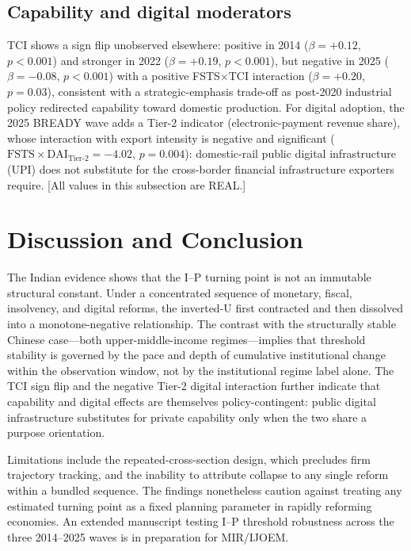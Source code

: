 \documentclass[12pt,a4paper]{article}
\begin{document}
\subsection{Capability and digital moderators}
TCI shows a sign flip unobserved elsewhere: positive in 2014
($\beta=+0.12$, $p<0.001$) and stronger in 2022 ($\beta=+0.19$, $p<0.001$),
but negative in 2025 ($\beta=-0.08$, $p<0.001$) with a positive
FSTS$\times$TCI interaction ($\beta=+0.20$, $p=0.03$), consistent with a
strategic-emphasis trade-off \citep{mizik2003} as post-2020 industrial policy
redirected capability toward domestic production. For digital adoption, the
2025 BREADY wave adds a Tier-2 indicator (electronic-payment revenue share),
whose interaction with export intensity is negative and significant
($\mathrm{FSTS}\times\mathrm{DAI}_{\text{Tier-2}}=-4.02$, $p=0.004$):
domestic-rail public digital infrastructure (UPI) does not substitute for the
cross-border financial infrastructure exporters require. [All values in this
subsection are REAL.]

\section{Discussion and Conclusion}
The Indian evidence shows that the I--P turning point is not an immutable
structural constant. Under a concentrated sequence of monetary, fiscal,
insolvency, and digital reforms, the inverted-U first contracted and then
dissolved into a monotone-negative relationship. The contrast with the
structurally stable Chinese case---both upper-middle-income regimes---implies
that threshold stability is governed by the pace and depth of cumulative
institutional change within the observation window, not by the institutional
regime label alone. The TCI sign flip and the negative Tier-2 digital
interaction further indicate that capability and digital effects are
themselves policy-contingent: public digital infrastructure substitutes for
private capability only when the two share a purpose orientation.

Limitations include the repeated-cross-section design, which precludes firm
trajectory tracking, and the inability to attribute collapse to any single
reform within a bundled sequence. The findings nonetheless caution against
treating any estimated turning point as a fixed planning parameter in rapidly
reforming economies. An extended manuscript testing I--P threshold robustness
across the three 2014--2025 waves is in preparation for MIR/IJOEM.


\end{document}
